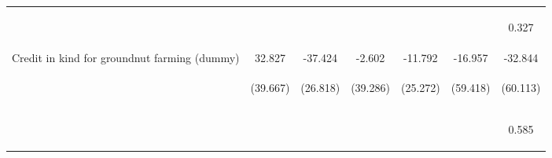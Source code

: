\begin{center}
\begin{tabular}{lcccccc}
\vspace{4pt} & \begin{footnotesize}[0.076]\end{footnotesize} & \begin{footnotesize}[0.779]\end{footnotesize} & \begin{footnotesize}[0.226]\end{footnotesize} & \begin{footnotesize}[0.334]\end{footnotesize} & \begin{footnotesize}[0.422]\end{footnotesize} & \begin{footnotesize}0.327\end{footnotesize} \\
Credit in kind for groundnut farming (dummy) & 32.827 & -37.424 & -2.602 & -11.792 & -16.957 & -32.844 \\
 & \begin{footnotesize}(39.667)\end{footnotesize} & \begin{footnotesize}(26.818)\end{footnotesize} & \begin{footnotesize}(39.286)\end{footnotesize} & \begin{footnotesize}(25.272)\end{footnotesize} & \begin{footnotesize}(59.418)\end{footnotesize} & \begin{footnotesize}(60.113)\end{footnotesize} \\
\vspace{4pt} & \begin{footnotesize}[0.408]\end{footnotesize} & \begin{footnotesize}[0.163]\end{footnotesize} & \begin{footnotesize}[0.947]\end{footnotesize} & \begin{footnotesize}[0.641]\end{footnotesize} & \begin{footnotesize}[0.775]\end{footnotesize} & \begin{footnotesize}0.585\end{footnotesize} \\

\end{tabular}
\end{center}
